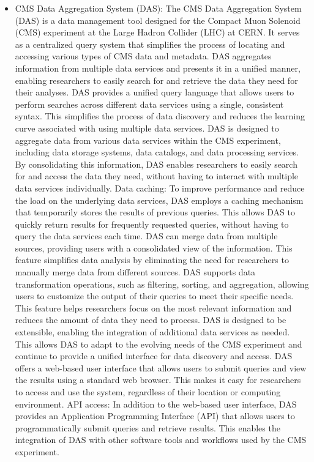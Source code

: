 \begin{itemize}
\item CMS Data Aggregation System (DAS): The CMS Data Aggregation System (DAS) is a data management tool designed for the Compact Muon Solenoid (CMS) experiment at the Large Hadron Collider (LHC) at CERN. It serves as a centralized query system that simplifies the process of locating and accessing various types of CMS data and metadata. DAS aggregates information from multiple data services and presents it in a unified manner, enabling researchers to easily search for and retrieve the data they need for their analyses. DAS provides a unified query language that allows users to perform searches across different data services using a single, consistent syntax. This simplifies the process of data discovery and reduces the learning curve associated with using multiple data services. DAS is designed to aggregate data from various data services within the CMS experiment, including data storage systems, data catalogs, and data processing services. By consolidating this information, DAS enables researchers to easily search for and access the data they need, without having to interact with multiple data services individually. Data caching: To improve performance and reduce the load on the underlying data services, DAS employs a caching mechanism that temporarily stores the results of previous queries. This allows DAS to quickly return results for frequently requested queries, without having to query the data services each time. DAS can merge data from multiple sources, providing users with a consolidated view of the information. This feature simplifies data analysis by eliminating the need for researchers to manually merge data from different sources. DAS supports data transformation operations, such as filtering, sorting, and aggregation, allowing users to customize the output of their queries to meet their specific needs. This feature helps researchers focus on the most relevant information and reduces the amount of data they need to process. DAS is designed to be extensible, enabling the integration of additional data services as needed. This allows DAS to adapt to the evolving needs of the CMS experiment and continue to provide a unified interface for data discovery and access. DAS offers a web-based user interface that allows users to submit queries and view the results using a standard web browser. This makes it easy for researchers to access and use the system, regardless of their location or computing environment. API access: In addition to the web-based user interface, DAS provides an Application Programming Interface (API) that allows users to programmatically submit queries and retrieve results. This enables the integration of DAS with other software tools and workflows used by the CMS experiment.


\end{itemize}
